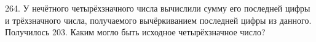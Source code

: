264. У нечётного четырёхзначного числа вычислили сумму его последней цифры и трёхзначного числа, получаемого вычёркиванием последней цифры из данного. Получилось 203. Каким могло быть исходное четырёхзначное число?\\
